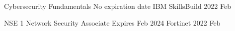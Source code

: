

\begin{cvhonors}

 
 \cvhonor
 {Cybersecurity Fundamentals} %
 {No expiration date} %
 {IBM SkillsBuild} %
 {2022 Feb} %

 \cvhonor
 {NSE 1 Network Security Associate}
 {Expires Feb 2024}
 {Fortinet}
 {2022 Feb}

\end{cvhonors}
